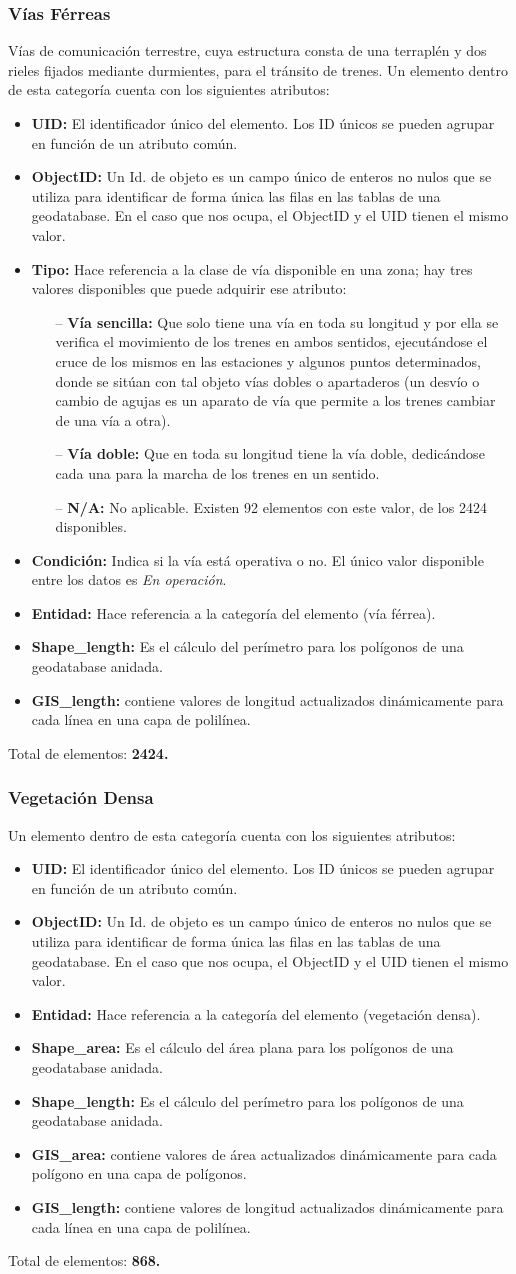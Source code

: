 \documentclass[10pt,letterpaper]{article}
\newcommand{\descripcion}{Un elemento dentro de esta categor\'ia cuenta con los siguientes atributos:}
\newcommand{\total}{Total de elementos: }
\newcommand{\UID}{\textbf{UID:} El identificador \'unico del elemento. Los ID \'unicos se pueden agrupar en funci\'on de un atributo com\'un.}
\newcommand{\OID}{\textbf{ObjectID:} Un Id. de objeto es un campo \'unico de enteros no nulos que se utiliza para identificar de forma \'unica las filas en las tablas de una geodatabase. En el caso que nos ocupa, el ObjectID y el UID tienen el mismo valor.}
\newcommand{\ent}{\textbf{Entidad:} Hace referencia a la categor\'ia del elemento }
\newcommand{\SHA}{\textbf{Shape\_area:} Es el c\'alculo del \'area plana para los pol\'igonos de una geodatabase anidada.}
\newcommand{\SHL}{\textbf{Shape\_length:} Es el c\'alculo del per\'imetro para los pol\'igonos de una geodatabase anidada.}
\newcommand{\GISA}{\textbf{GIS\_area:} contiene valores de \'area actualizados din\'amicamente para cada pol\'igono en una capa de pol\'igonos.}
\newcommand{\GISL}{\textbf{GIS\_length:} contiene valores de longitud actualizados din\'amicamente para cada l\'inea en una capa de polil\'inea.}
\begin{document}
\subsubsection{V\'ias F\'erreas}
V\'ias de comunicaci\'on terrestre, cuya estructura consta de una terrapl\'en y dos rieles fijados mediante durmientes, para el tr\'ansito de trenes. \descripcion
\begin{itemize}
	\item \UID
	\item \OID
	\item \textbf{Tipo:} Hace referencia a la clase de v\'ia disponible en una zona; hay tres valores disponibles que puede adquirir ese atributo:
	\begin{itemize}
		\item[--] \textbf{V\'ia sencilla:} Que solo tiene una v\'ia en toda su longitud y por ella se verifica el movimiento de los trenes en ambos sentidos, ejecut\'andose el cruce de los mismos en las estaciones y algunos puntos determinados, donde se sit\'uan con tal objeto v\'ias dobles o apartaderos (un desv\'io o cambio de agujas es un aparato de v\'ia que permite a los trenes cambiar de una v\'ia a otra).
		\item[--] \textbf{V\'ia doble:} Que en toda su longitud tiene la v\'ia doble, dedic\'andose cada una para la marcha de los trenes en un sentido.
		\item[--] \textbf{N/A:} No aplicable. Existen 92 elementos con este valor, de los 2424 disponibles. 
	\end{itemize}
	\item \textbf{Condici\'on:} Indica si la v\'ia est\'a operativa o no. El \'unico valor disponible entre los datos es \emph{En operaci\'on}.
	\item \ent (v\'ia f\'errea).
	\item \SHL
	\item \GISL
\end{itemize}
\total \textbf{2424.}

\subsubsection{Vegetaci\'on Densa}
\descripcion
\begin{itemize}
	\item \UID
	\item \OID
	\item \ent (vegetaci\'on densa).
	\item \SHA
	\item \SHL
	\item \GISA
	\item \GISL
\end{itemize}
\total \textbf{868.}
\end{document}
